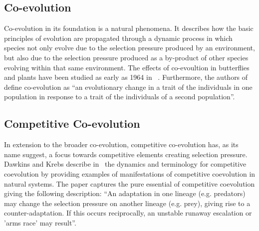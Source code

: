 \documentclass[conference]{IEEEtran}
\begin{document}
\subsection{Co-evolution}
Co-evolution in its foundation is a natural phenomena.
It describes how the basic principles of evolution are propagated through a dynamic process in which species not only evolve due to the selection pressure produced by an environment, but also due to the selection pressure produced as a by-product of other species evolving within that same environment.
The effects of co-evoultion in butterflies and plants have been studied as early as 1964 in ~\cite{ehrlich1964butterflies}.
Furthermore, the authors of ~\cite{janzen1980coevolution} define co-evolution as ``an evolutionary change in a trait of the individuals in one population in response to a trait of the individuals of a second population''. 


\subsection{Competitive Co-evolution}
In extension to the broader co-evolution, competitive co-evolution has, as its name suggest, a focus towards competitive elements creating selection pressure.
Dawkins and Krebs describe in~\cite{dawkins1979arms} the dynamics and terminology for competitive coevolution by providing examples of manifestations of competitive coevolution in natural systems. 
The paper captures the pure essential of competitive coevolution giving the following description: ``An adaptation in one lineage (e.g. predators) may change the selection pressure on another lineage (e.g. prey), giving rise to a counter-adaptation. If this occurs reciprocally, an unstable runaway escalation or 'arms race' may result''.
\end{document}
